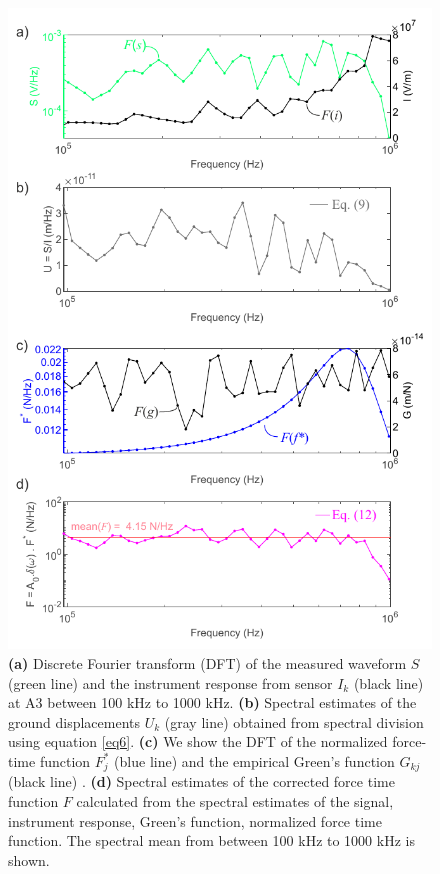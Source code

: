 \documentclass[preprint,3p, 11pt,authoryear]{elsarticle}
\begin{document}
{\begin{figure}[ht]
     	\centering
\includegraphics[scale= 1]{FIG7.pdf} 
\caption{\textbf{(a)} Discrete Fourier transform (DFT) of the measured waveform $S$ (green line) and the instrument response from sensor $I_{k}$ (black line) at A3 between 100 kHz to 1000 kHz. \textbf{(b)} Spectral estimates of the ground displacements $U_{k}$ (gray line) obtained from spectral division using equation \eqref{eq6}. \textbf{(c)} We show the DFT of the normalized force-time function $F_{j}^{*}$ (blue line) and the empirical Green's function $G_{kj}$ (black line) . \textbf{(d)} Spectral estimates of the corrected force time function $F$ calculated from the spectral estimates of the signal, instrument response, Green's function, normalized force time function. The spectral mean from between 100 kHz to 1000 kHz is shown.}
	\label{fig7} 
\end{figure}

}
\end{document}
